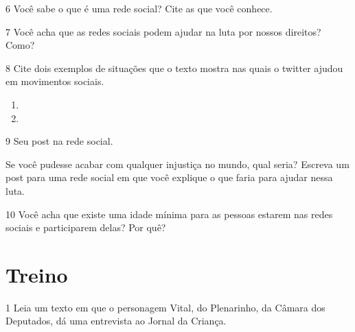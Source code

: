 \num{6} Você sabe o que é uma rede social? Cite as que você conhece.


\num{7} Você acha que as redes sociais podem ajudar na luta por nossos direitos? Como?


\num{8} Cite dois exemplos de situações que o texto mostra nas quais o twitter ajudou
em movimentos sociais.

\begin{enumerate}
\item {}

\item {}
\end{enumerate}

\pagebreak
\num{9} Seu post na rede social.

Se você pudesse acabar com qualquer injustiça no mundo, qual seria?
Escreva um post para uma rede social em que você explique o que faria para ajudar nessa luta.

\begin{mdframed}[linewidth=2pt,linecolor=salmao]
\vspace{18cm}
\end{mdframed}

\pagebreak
\num{10} Você acha que existe uma idade mínima para as pessoas estarem nas redes sociais e participarem delas? Por quê?


\pagebreak
\section{Treino}

\num{1}
Leia um texto em que o personagem Vital, do Plenarinho, da Câmara dos Deputados, dá uma entrevista ao Jornal da Criança.\bigskip

